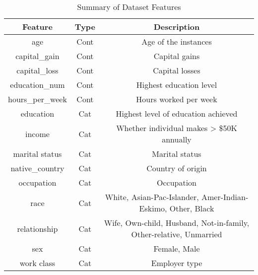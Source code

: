 \documentclass[conference]{IEEEtran}
\begin{document}
\begin{table}[h]
\centering
\caption{Summary of Dataset Features}
\label{tab:features}
\begin{center}
\scriptsize
\setlength{\tabcolsep}{0.01pt} %
\begin{tabular}{|c|c|c|}
\hline
\textbf{Feature}       & \textbf{Type} & \textbf{Description} \\
\hline
age                    & Cont          & Age of the instances \\
capital\_gain          & Cont          & Capital gains \\
capital\_loss          & Cont          & Capital losses \\
education\_num         & Cont          & Highest education level \\
hours\_per\_week       & Cont          & Hours worked per week \\
education              & Cat           & Highest level of education achieved \\
income                 & Cat           & Whether individual makes > \$50K annually \\
marital status         & Cat           & Marital status \\
native\_country        & Cat           & Country of origin \\
occupation             & Cat           & Occupation \\
race                   & Cat           & White, Asian-Pac-Islander, Amer-Indian-Eskimo, Other, Black \\
relationship           & Cat           & Wife, Own-child, Husband, Not-in-family, Other-relative, Unmarried \\
sex                    & Cat           & Female, Male \\
work class              & Cat           & Employer type \\
\hline
\end{tabular}
\end{center}
\end{table}
\end{document}
